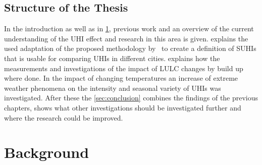 \documentclass[12pt,a4paper, english,twoside]{scrartcl}
\begin{document}
  \subsection{Structure of the Thesis}\label{ssec:structure} 
    In the introduction as well as in \cref{sec:background}, previous work and an overview of the current understanding of the \gls{UHI} effect and research in this area is given. 
     explains the used adaptation of the proposed methodology by~\cite{Sobrino2020} to create a definition of \glspl{SUHI} that is usable for comparing \glspl{UHI} in different cities.  
     explains how the measurements  and investigations of the impact of \gls{LULC} changes by build up where done.
    In  the impact of changing temperatures an increase of extreme weather phenomena on the intensity and seasonal variety of \glspl{UHI} was investigated. 
    After these the \cref{sec:conclusion} combines the findings of the previous chapters, shows what other investigations should be investigated further and where the research could be improved. 
%
\newpage
\section{Background}\label{sec:background}
\end{document}
